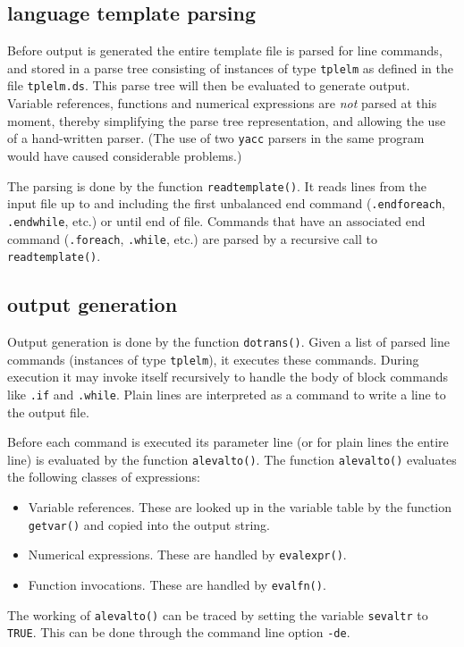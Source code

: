 \subsection{language template parsing}
Before output is generated the entire template file is parsed for line
commands, and stored in a parse tree consisting of instances of type
{\tt tplelm} as defined in the file {\tt tplelm.ds}.
This parse tree will then be evaluated to generate output.
Variable references, functions and numerical expressions are {\em not}
parsed at this moment, thereby simplifying the parse tree representation,
and allowing the use of a hand-written parser.
(The use of two {\tt yacc} parsers in the same program would have
caused considerable problems.)
\par
The parsing is done by the function {\tt readtemplate()}.
It reads lines from the input file up to and including the first
unbalanced end command ({\tt .endforeach}, {\tt .endwhile}, etc.)
or until end of file.
Commands that have an associated end command ({\tt .foreach},
{\tt .while}, etc.) are parsed by a recursive call to {\tt readtemplate()}.
\subsection{output generation}
Output generation is done by the function {\tt dotrans()}.
Given a list of parsed line commands (instances of type {\tt tplelm}),
it executes these commands.
During execution it may invoke itself recursively to handle
the body of block commands like {\tt .if} and {\tt .while}.
Plain lines are interpreted as a command to write a line to the
output file.
\par
Before each command is executed its parameter line (or for
plain lines the entire line) is evaluated by the function {\tt alevalto()}.
The function {\tt alevalto()} evaluates the following classes of
expressions:
\begin{itemize}
\item Variable references. These are looked up in the variable table 
      by the function {\tt getvar()} and copied into the output string.

\item Numerical expressions. These are handled by {\tt evalexpr()}.

\item Function invocations. These are handled by {\tt evalfn()}.
\end{itemize}
The working of {\tt alevalto()} can be traced by setting the variable
{\tt sevaltr} to {\tt TRUE}.
This can be done through the command line option {\tt -de}.
